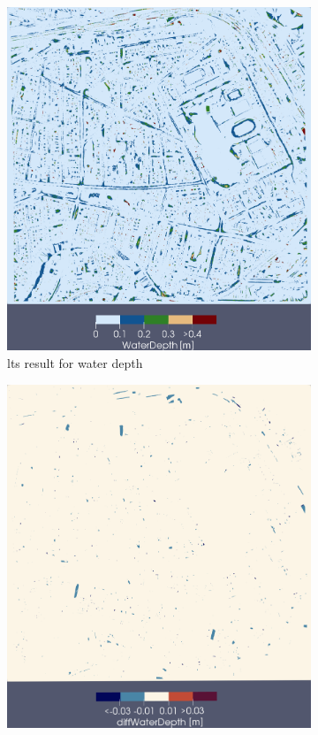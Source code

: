 \begin{figure} [p]
  \centering
  \begin{subfigure}[t]{0.45\textwidth}
    \centering
    \includegraphics[width=\textwidth]{./img/moabit-1200s-lts-fo-d.png}
    \caption{
      \acrshort{lts} result for water depth
    }
    \label{fig:moabit-1200s-lts-fo-d}
  \end{subfigure}
  \hspace{0.5cm}
  \begin{subfigure}[t]{0.45\textwidth}
    \centering
    \includegraphics[width=\textwidth]{./img/moabit-1200s-lts-fo-diff.png}

\end{subfigure}
\end{figure}
